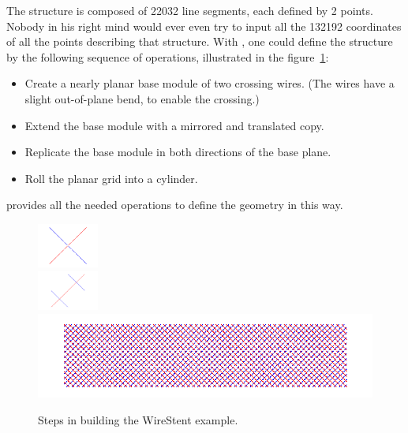 The structure is composed of 22032 line segments, each defined by 2 points. Nobody in his right mind would ever even try to input all the 132192 coordinates of all the points describing that structure. 
With \pyformex, one could define the structure by the following sequence of operations, illustrated in the figure~\ref{fig:WireStent-steps}:
 \begin{itemize}
 \item Create a nearly planar base module of two crossing wires. (The wires have a slight out-of-plane bend, to enable the crossing.) 
 \item Extend the base module with a mirrored and translated copy.
 \item Replicate the base module in both directions of the base plane.
 \item Roll the planar grid into a cylinder.
 \end{itemize}
\pyf provides all the needed operations to define the geometry in this way.
 \begin{figure}[h]
   \centering
   \begin{makeimage}
   \end{makeimage}
   \begin{latexonly}
     \includegraphics[width=2cm]{images/wirestent-1}\\
     \includegraphics[width=2cm]{images/wirestent-2}\\
     \includegraphics[width=12cm]{images/wirestent-3}
   \end{latexonly}
   \begin{htmlonly}
   \end{htmlonly}  
   \caption{Steps in building the WireStent example.}   \label{fig:WireStent-steps}

 \end{figure}


